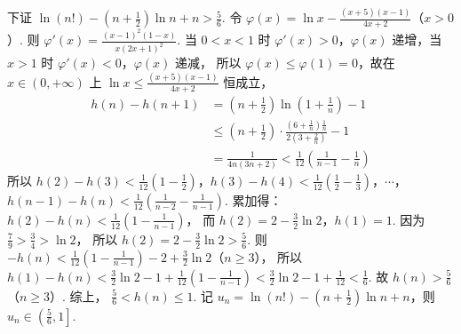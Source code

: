 \begin{solution}
\begin{enumerate}
下证
\(\ln(n!)-\left( n+\frac{1}{2} \right)\ln n+n>\frac{5}{6}\).
令
\(\varphi(x)=\ln x-\frac{(x+5)(x-1)}{4x+2}\)（\(x>0\)）.
则
\(\varphi'(x)=\frac{(x-1)^2(1-x)}{x(2x+1)^2}\).
当 \(0<x<1\) 时 \(\varphi'(x)>0\)，\(\varphi(x)\) 递增，当 \(x>1\) 时 \(\varphi'(x)<0\)，\(\varphi(x)\) 递减，
所以 \(\varphi(x)\le \varphi(1)=0\)，故在 \(x\in (0,+\infty)\) 上
\(\ln x\le \frac{(x+5)(x-1)}{4x+2}\)
恒成立，
\[
\begin{aligned}
h(n)-h(n+1)
&=\left( n+\frac{1}{2} \right)\ln\left( 1+\frac{1}{n} \right)-1 \\
&\le \left( n+\frac{1}{2} \right)\cdot \frac{\left( 6+\frac{1}{n} \right)\frac{1}{n}}{2\left( 3+\frac{2}{n} \right)}-1 \\
&=\frac{1}{4n(3n+2)} <\frac{1}{12}\left( \frac{1}{n-1}-\frac{1}{n} \right)
\end{aligned}
\]
所以 \(h(2)-h(3)<\frac{1}{12}\left( 1-\frac{1}{2} \right)\)，\(h(3)-h(4)<\frac{1}{12}\left( \frac{1}{2}-\frac{1}{3} \right)\)，\(\cdots\)，\(h(n-1)-h(n)<\frac{1}{12}\left( \frac{1}{n-2}-\frac{1}{n-1} \right)\).
累加得：
\(h(2)-h(n)<\frac{1}{12}\left( 1-\frac{1}{n-1} \right)\)，
而
\(h(2)=2-\frac{3}{2}\ln 2\)，\(h(1)=1\).
因为
\(\frac{7}{9}>\frac{3}{4}>\ln 2\)，
所以
\(h(2)=2-\frac{3}{2}\ln 2>\frac{5}{6}\).
则
\(-h(n)<\frac{1}{12}\left( 1-\frac{1}{n-1} \right)-2+\frac{3}{2}\ln 2\)（\(n\ge 3\)），
所以 \(h(1)-h(n)<\frac{3}{2}\ln 2-1+\frac{1}{12}\left( 1-\frac{1}{n-1} \right)<\frac{3}{2}\ln 2-1+\frac{1}{12}<\frac{1}{6}\).
故
\(h(n)>\frac{5}{6}\)（\(n\ge 3\)）.
综上，
\(\frac{5}{6}<h(n)\le 1\).
记 \(u_n=\ln(n!)-\left( n+\frac{1}{2} \right)\ln n+n\)，则 \(u_n\in \left( \frac{5}{6},1 \right]\).
\end{enumerate}
\end{solution}
